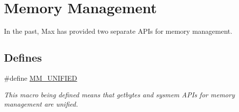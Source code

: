 \hypertarget{group__memory}{
\section{Memory Management}
\label{group__memory}
}


In the past, Max has provided two separate APIs for memory management.  
\subsection*{Defines}
\begin{DoxyCompactItemize}
\item 
\#define \hyperlink{group__memory_ga6ae185a510cc76224680e6156b843055}{MM\_\-UNIFIED}
\begin{DoxyCompactList}\small\item\em This macro being defined means that getbytes and sysmem APIs for memory management are unified. \item\end{DoxyCompactList}\end{DoxyCompactItemize}
